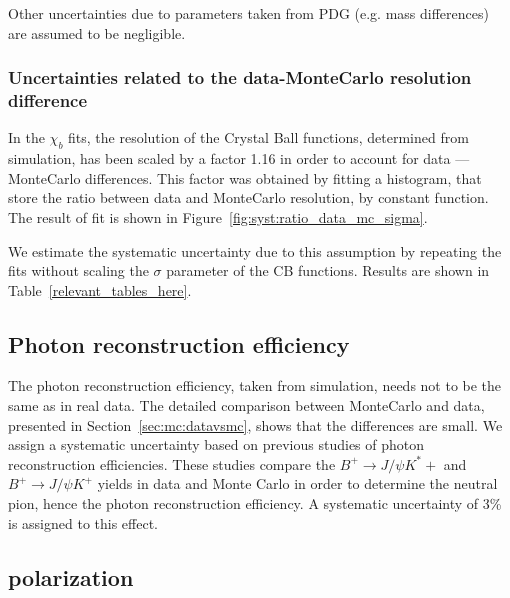 Other uncertainties due to parameters taken from PDG (e.g. mass differences)
are assumed to be negligible.

\subsubsection{Uncertainties related to the data-MonteCarlo resolution difference}

In the $\chi_b$ fits, the resolution of the Crystal Ball functions, determined
from simulation, has been scaled by a factor 1.16 in order to account for data ---
MonteCarlo differences. This factor was obtained by fitting a histogram, 
that store the ratio between data and MonteCarlo resolution, by constant function.
The result of fit is shown in Figure~\ref{fig:syst:ratio_data_mc_sigma}.

We estimate the systematic uncertainty due to this assumption by repeating the
fits without scaling the $\sigma$ parameter of the CB functions. Results are
shown in Table~\ref{relevant_tables_here}.






\subsection{Photon reconstruction efficiency}
The photon reconstruction efficiency, taken from simulation, needs not to be
the same as in real data. The detailed comparison between MonteCarlo and data,
presented in Section~\ref{sec:mc:datavsmc}, shows that the differences
are small. We assign a systematic uncertainty based on previous studies of
photon reconstruction efficiencies. These studies compare the $B^+ \rightarrow
J/\psi K^*+$ and $B^+ \rightarrow J/\psi K^+$ yields in data and Monte Carlo in
order to determine the neutral pion, hence the photon  reconstruction
efficiency. A systematic uncertainty of 3\% is assigned to this effect.












\subsection{\chib polarization}
\label{sec:syst:pol}

